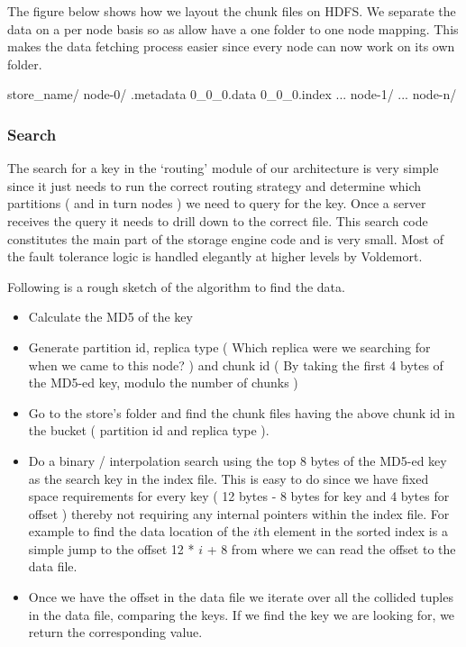 \documentclass[10pt,twocolumn,preprint,natbib,authoryear]{sigplanconf}
\begin{document}
The figure below shows how we layout the chunk files on HDFS. We separate the data on a per node basis so as allow have a one folder to one node mapping. This makes the data fetching process easier since every node can now work on its own folder. 

\scriptsize
\begin{verbatimtab}
store_name/
  node-0/
    .metadata
    0_0_0.data
    0_0_0.index
    ...
  node-1/
  ...
  node-n/
\end{verbatimtab}
\normalsize


\subsubsection{Search}
\label{sec:read_only:search}

The search for a key in the `routing' module of our architecture is very simple since it just needs to run the correct routing strategy and determine which partitions ( and in turn nodes ) we need to query for the key. Once a server receives the query it needs to drill down to the correct file. This search code constitutes the main part of the storage engine code and is very small. Most of the fault tolerance logic is handled elegantly at higher levels by Voldemort.

Following is a rough sketch of the algorithm to find the data. 

\begin{itemize}
	\item Calculate the MD5 of the key
	\item Generate partition id, replica type ( Which replica were we searching for when we came to this node? ) and chunk id ( By taking the first 4 bytes of the MD5-ed key, modulo the number of chunks )
	\item Go to the store's folder and find the chunk files having the above chunk id in the bucket ( partition id and replica type ). 
	\item Do a binary / interpolation search using the top 8 bytes of the MD5-ed key as the search key in the index file. This is easy to do since we have fixed space requirements for every key ( 12 bytes - 8 bytes for key and 4 bytes for offset ) thereby not requiring any internal pointers within the index file. For example to find the data location of the $i$th element in the sorted index is a simple jump to the offset 12 * $i$ + 8 from where we can read the offset to the data file.  
	\item Once we have the offset in the data file we iterate over all the collided tuples in the data file, comparing the keys. If we find the key we are looking for, we return the corresponding value.
\end{itemize}
\end{document}
